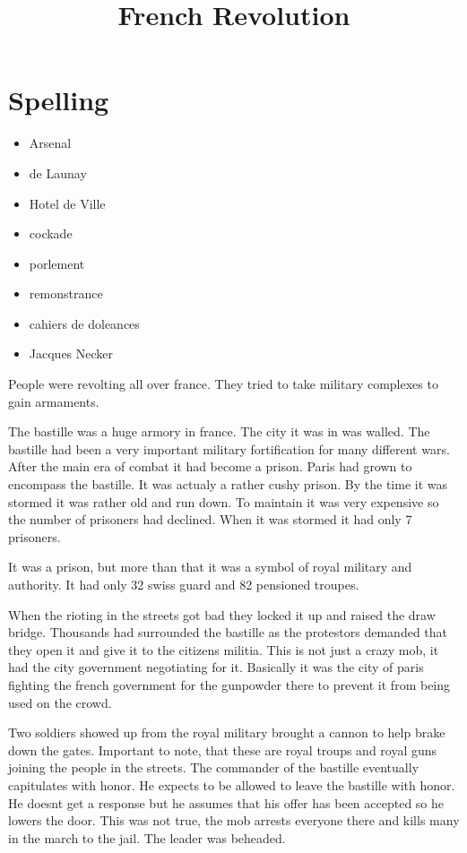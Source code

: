 \documentclass{article}
\begin{document}
\title{French Revolution}
\section*{Spelling}
\label{sec:spelling}
\begin{itemize}
	\item Arsenal
	\item de Launay
	\item Hotel de Ville
	\item cockade
	\item porlement
	\item remonstrance
	\item cahiers de doleances
	\item Jacques Necker
\end{itemize} 

\maketitle
People were revolting all over france. They tried to take military complexes to gain armaments.

The bastille was a huge armory in france. The city it was in was walled. The bastille had been a very important military fortification for many different wars. After the main era of combat it had become a prison. Paris had grown to encompass the bastille. It was actualy a rather cushy prison. By the time it was stormed it was rather old and run down. To maintain it was very expensive so the number of prisoners had declined. When it was stormed it had only 7 prisoners.

It was a prison, but more than that it was a symbol of royal military and authority. It had only 32 swiss guard and 82 pensioned troupes.

When the rioting in the streets got bad they locked it up and raised the draw bridge. Thousands had surrounded the bastille as the protestors demanded that they open it and give it to the citizens militia. This is not just a crazy mob, it had the city government negotiating for it. Basically it was the city of paris fighting the french government for the gunpowder there to prevent it from being used on the crowd.

Two soldiers showed up from the royal military brought a cannon to help brake down the gates. Important to note, that these are royal troups and royal guns joining the people in the streets. The commander of the bastille eventually capitulates with honor. He expects to be allowed to leave the bastille with honor. He doesnt get a response but he assumes that his offer has been accepted so he lowers the door. This was not true, the mob arrests everyone there and kills many in the march to the jail. The leader was beheaded.
\end{document}
